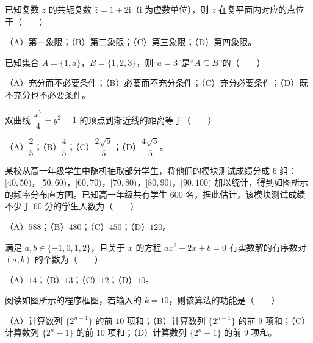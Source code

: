\begin{question}
已知复数 $z$ 的共轭复数 $\bar z=1+2\mathrm i$（$\mathrm i$ 为虚数单位），则 $z$ 在复平面内对应的点位于\mbox{（　　）}

（A）第一象限；（B）第二象限；（C）第三象限；（D）第四象限。

\end{question}
\begin{question}
已知集合 $A=\{1,a\}$，$B=\{1,2,3\}$，则“$a=3$”是“$A\subseteq B$”的\mbox{（　　）}

（A）充分而不必要条件；（B）必要而不充分条件；（C）充分必要条件；（D）既不充分也不必要条件。

\end{question}
\begin{question}
双曲线 $\dfrac{x^2}{4}-y^2=1$ 的顶点到渐近线的距离等于\mbox{（　　）}

（A）$\dfrac25$；（B）$\dfrac45$；（C）$\dfrac{2\sqrt5}{5}$；（D）$\dfrac{4\sqrt5}{5}$。

\Needspace{0.4\textheight}
\end{question}
\begin{question}
某校从高一年级学生中随机抽取部分学生，将他们的模块测试成绩分成 $6$ 组：$[40,50)$，$[50,60)$，$[60,70)$，$[70,80)$，$[80,90)$，$[90,100)$ 加以统计，得到如图所示的频率分布直方图。已知高一年级共有学生 $600$ 名，据此估计，该模块测试成绩不少于 $60$ 分的学生人数为\mbox{（　　）}
\nopagebreak[4]
\begin{center}\end{center}
\nopagebreak[4]
（A）$588$；（B）$480$；（C）$450$；（D）$120$。

\end{question}
\begin{question}
满足 $a,b\in\{-1,0,1,2\}$，且关于 $x$ 的方程 $ax^2+2x+b=0$ 有实数解的有序数对 $(a,b)$ 的个数为\mbox{（　　）}

（A）$14$；（B）$13$；（C）$12$；（D）$10$。

\Needspace{0.4\textheight}
\end{question}
\begin{question}
阅读如图所示的程序框图，若输入的 $k=10$，则该算法的功能是\mbox{（　　）}
\nopagebreak[4]
\begin{center}\end{center}
\nopagebreak[4]
（A）计算数列 $\{2^{n-1}\}$ 的前 $10$ 项和；（B）计算数列 $\{2^{n-1}\}$ 的前 $9$ 项和；（C）计算数列 $\{2^n-1\}$ 的前 $10$ 项和；（D）计算数列 $\{2^n-1\}$ 的前 $9$ 项和。

\end{question}
